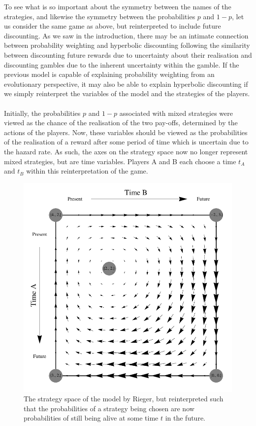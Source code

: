 \documentclass[a4paper,10pt]{article}
\numberwithin{equation}{section}
\begin{document}
To see what is so important about the symmetry between the names of the strategies, and likewise the symmetry between the probabilities $p$ and $1-p$, let us consider the same game as above, but reinterpreted to include future discounting. As we saw in the introduction, there may be an intimate connection between probability weighting and hyperbolic discounting following the similarity between discounting future rewards due to uncertainty about their realisation and discounting gambles due to the inherent uncertainty within the gamble. If the previous model is capable of explaining probability weighting from an evolutionary perspective, it may also be able to explain hyperbolic discounting if we simply reinterpret the variables of the model and the strategies of the players.\\
\\
Initially, the probabilities $p$ and $1-p$ associated with mixed strategies were viewed as the chance of the realisation of the two pay-offs, determined by the actions of the players. Now, these variables should be viewed as the probabilities of the realisation of a reward after some period of time which is uncertain due to the hazard rate. As such, the axes on the strategy space now no longer represent mixed strategies, but are time variables. Players A and B each choose a time $t_A$ and $t_B$ within this reinterpretation of the game.

\begin{figure}[h]
\begin{center}
\leavevmode
\includegraphics[scale=.57]{Graph14.pdf}
\captionsetup{width=360pt}
\caption{The strategy space of the model by Rieger, but reinterpreted such that the probabilities of a strategy being chosen are now probabilities of still being alive at some time $t$ in the future.}
\label{fig:Graph14.pdf}
\end{center}
\end{figure}
\end{document}
